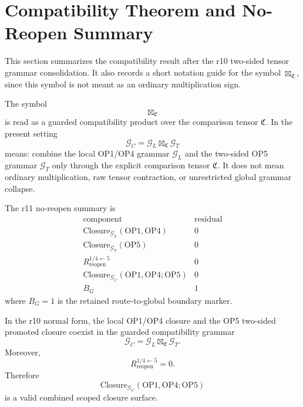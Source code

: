 
\section{Compatibility Theorem and No-Reopen Summary}
\label{sec:v450-r11-compatibility-theorem-no-reopen-summary}

This section summarizes the compatibility result after the r10 two-sided tensor
grammar consolidation.  It also records a short notation guide for the symbol
\(\boxtimes_{\mathfrak C}\), since this symbol is not meant as an ordinary
multiplication sign.

\begin{definition}
The symbol
\[
    \boxtimes_{\mathfrak C}
\]
is read as a guarded compatibility product over the comparison tensor
\(\mathfrak C\).  In the present setting
\[
    \mathcal G_C
    =
    \mathcal G_L \boxtimes_{\mathfrak C} \mathcal G_T
\]
means: combine the local OP1/OP4 grammar \(\mathcal G_L\) and the two-sided
OP5 grammar \(\mathcal G_T\) only through the explicit comparison tensor
\(\mathfrak C\).  It does not mean ordinary multiplication, raw tensor
contraction, or unrestricted global grammar collapse.
\end{definition}

\begin{proposition}
The r11 no-reopen summary is
\[
\begin{array}{c|r}
\text{component} & \text{residual}\\
\hline
\mathrm{Closure}_{\mathcal G_L}(\mathrm{OP1},\mathrm{OP4}) & 0\\
\mathrm{Closure}_{\mathcal G_T}(\mathrm{OP5}) & 0\\
R_{\mathrm{reopen}}^{1/4\leftarrow 5} & 0\\
\mathrm{Closure}_{\mathcal G_C}(\mathrm{OP1},\mathrm{OP4};\mathrm{OP5}) & 0\\
B_G & 1
\end{array}
\]
where \(B_G=1\) is the retained route-to-global boundary marker.
\end{proposition}

\begin{theorem}
In the r10 normal form, the local OP1/OP4 closure and the OP5 two-sided
promoted closure coexist in the guarded compatibility grammar
\[
    \mathcal G_C
    =
    \mathcal G_L \boxtimes_{\mathfrak C} \mathcal G_T.
\]
Moreover,
\[
    R_{\mathrm{reopen}}^{1/4\leftarrow 5}=0.
\]
Therefore
\[
    \mathrm{Closure}_{\mathcal G_C}(\mathrm{OP1},\mathrm{OP4};\mathrm{OP5})
\]
is a valid combined scoped closure surface.
\end{theorem}

